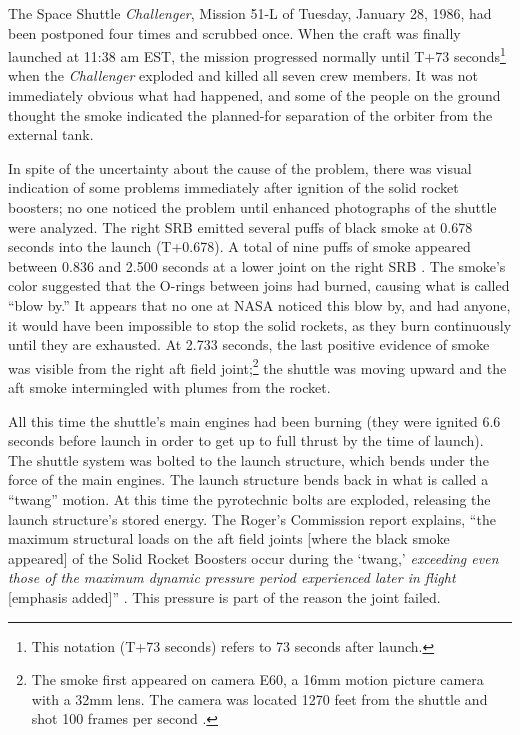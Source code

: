 The Space Shuttle {\em Challenger}, Mission 51-L of Tuesday, January 28, 1986, had been postponed four times and scrubbed once. When the craft was finally launched at 11:38 am EST, the mission progressed normally until T+73 seconds\footnote{This notation (T+73 seconds) refers to 73 seconds after launch.} when the {\em Challenger} exploded and killed all seven crew members. It was not immediately obvious what had happened, and some of the people on the ground thought the smoke indicated the planned-for separation of the orbiter from the external tank.

In spite of the uncertainty about the cause of the problem, there was visual indication of some problems immediately after ignition of the solid rocket boosters; no one noticed the problem until enhanced photographs of the shuttle were analyzed. The right SRB emitted several puffs of black smoke at 0.678 seconds into the launch (T+0.678). A total of nine puffs of smoke appeared between 0.836 and 2.500 seconds at a lower joint on the right SRB \cite[vol. 1, p. 19]{rogers}. The smoke's color suggested that the O-rings between joins had burned, causing what is called ``blow by.'' It appears that no one at NASA noticed this blow by, and had anyone, it would have been impossible to stop the solid rockets, as they burn continuously until they are exhausted. At 2.733 seconds, the last positive evidence of smoke was visible from the right aft field joint;\footnote{The smoke first appeared on camera E60, a 16mm motion picture camera with a 32mm lens. The camera was located 1270 feet from the shuttle and shot 100 frames per second \cite[vol. 3, p. N-9]{rogers}.} the shuttle was moving upward and the aft smoke intermingled with plumes from the rocket.

All this time the shuttle's main engines had been burning (they were ignited 6.6 seconds before launch in order to get up to full thrust by the time of launch). The shuttle system was bolted to the launch structure, which bends under the force of the main engines. The launch structure bends back in what is called a ``twang'' motion. At this time the pyrotechnic bolts are exploded, releasing the launch structure's stored energy. The Roger's Commission report explains, ``the maximum structural loads on the aft field joints [where the black smoke appeared] of the Solid Rocket Boosters occur during the `twang,' {\em exceeding even those of the maximum dynamic pressure period experienced later in flight} [emphasis added]'' \cite[p. 19]{rogers}. This pressure is part of the reason the joint failed.

